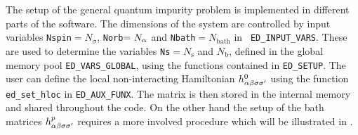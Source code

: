 \documentclass[edipack2.tex]{subfiles}
\begin{document}
The setup of the general quantum impurity problem is implemented in
different parts of the \NAME software. The dimensions of the system
are controlled by input variables {\tt Nspin}$=N_\sigma$,
{\tt Norb}$=N_\alpha$ and {\tt Nbath}$=N_\mathrm{bath}$ in {\tt
  ED\_INPUT\_VARS}. These are used to
determine the variables {\tt Ns}$=N_\mathrm{s}$ and $N_\mathrm{b}$, defined in the global
memory pool {\tt ED\_VARS\_GLOBAL}, using the functions contained
in {\tt ED\_SETUP}. 
The user can define the local non-interacting Hamiltonian
$h^0_{\alpha\beta\sigma\sigma'}$ using the function {\tt ed\_set\_hloc} in {\tt ED\_AUX\_FUNX}.
The matrix is then stored in the internal memory and shared throughout the
code.
On the other hand the setup of the bath matrices $h^p_{\alpha\beta\sigma\sigma'}$
requires a more involved procedure which will be illustrated in
. 
\end{document}
